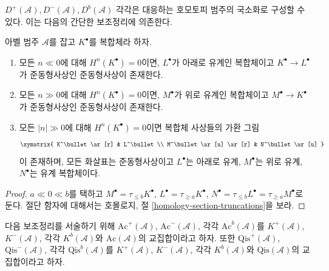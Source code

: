 \noindent
$D^{+}(\mathcal{A}), D^{-}(\mathcal{A}), D^b(\mathcal{A})$ 각각은
대응하는 호모토피 범주의 국소화로 구성할 수 있다. 이는 다음의 간단한
보조정리에 의존한다.

\begin{lemma}
\label{lemma-complex-cohomology-bounded}
아벨 범주 $\mathcal{A}$를 잡고 $K^\bullet$를 복합체라 하자.
\begin{enumerate}
\item 모든 $n \ll 0$에 대해 $H^n(K^\bullet) = 0$이면, $L^\bullet$가
아래로 유계인 복합체이고 $K^\bullet \to L^\bullet$가 준동형사상인
준동형사상이 존재한다.
\item 모든 $n \gg 0$에 대해 $H^n(K^\bullet) = 0$이면, $M^\bullet$가
위로 유계인 복합체이고 $M^\bullet \to K^\bullet$가 준동형사상인
준동형사상이 존재한다.
\item 모든 $|n| \gg 0$에 대해 $H^n(K^\bullet) = 0$이면 복합체 사상들의
가환 그림
$$
\xymatrix{
K^\bullet \ar[r] & L^\bullet \\
M^\bullet \ar[u] \ar[r] & N^\bullet \ar[u]
}
$$
이 존재하며, 모든 화살표는 준동형사상이고 $L^\bullet$는 아래로 유계,
$M^\bullet$는 위로 유계, $N^\bullet$는 유계 복합체이다.
\end{enumerate}
\end{lemma}

\begin{proof}
$a \ll 0 \ll b$를 택하고
$M^\bullet = \tau_{\leq b}K^\bullet$,
$L^\bullet = \tau_{\geq a}K^\bullet$,
$N^\bullet = \tau_{\leq b}L^\bullet = \tau_{\geq a}M^\bullet$로 둔다.
절단 함자에 대해서는 호몰로지, 절
\ref{homology-section-truncations}을 보라.
\end{proof}

\noindent
다음 보조정리를 서술하기 위해
$\text{Ac}^{+}(\mathcal{A})$, $\text{Ac}^{-}(\mathcal{A})$, 각각
$\text{Ac}^b(\mathcal{A})$를 $K^{+}(\mathcal{A})$, $K^{-}(\mathcal{A})$,
각각 $K^b(\mathcal{A})$와 $\text{Ac}(\mathcal{A})$의 교집합이라고 하자.
또한 $\text{Qis}^{+}(\mathcal{A})$, $\text{Qis}^{-}(\mathcal{A})$,
각각 $\text{Qis}^b(\mathcal{A})$를 $K^{+}(\mathcal{A})$,
$K^{-}(\mathcal{A})$, 각각 $K^b(\mathcal{A})$와
$\text{Qis}(\mathcal{A})$의 교집합이라고 하자.

